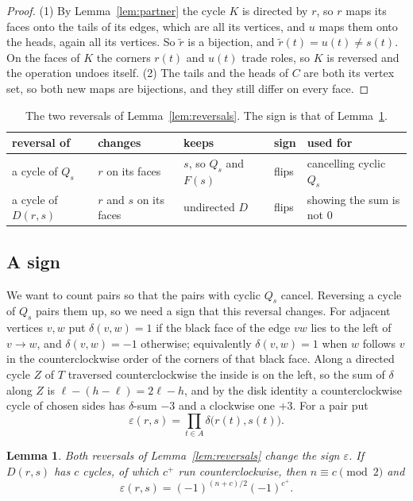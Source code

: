 \documentclass[10pt]{amsart}
\numberwithin{equation}{section}
\newtheorem{lemma}[equation]{Lemma}
\theoremstyle{definition}
\theoremstyle{remark}
\newcommand{\T}{T}
\newcommand{\eps}{\varepsilon}
\begin{document}
\begin{proof}
(1) By Lemma~\ref{lem:partner} the cycle $K$ is directed by $r$, so $r$ maps its faces onto the tails of its edges, which are all its vertices, and $u$ maps them onto the heads, again all its vertices.
So $\tilde r$ is a bijection, and $\tilde r(t)=u(t)\neq s(t)$.
On the faces of $K$ the corners $r(t)$ and $u(t)$ trade roles, so $K$ is reversed and the operation undoes itself.
(2) The tails and the heads of $C$ are both its vertex set, so both new maps are bijections, and they still differ on every face.
\end{proof}

\begin{table}[tb]
\centering
\begin{tabular}{@{}lllll@{}}
\toprule
reversal of & changes & keeps & sign & used for\\
\midrule
a cycle of $Q_s$ & $r$ on its faces & $s$, so $Q_s$ and $F(s)$ & flips & cancelling cyclic $Q_s$\\
a cycle of $D(r,s)$ & $r$ and $s$ on its faces & undirected $D$ & flips & showing the sum is not $0$\\
\bottomrule
\end{tabular}
\vspace{4pt}
\caption{The two reversals of Lemma~\ref{lem:reversals}. The sign is that of Lemma~\ref{lem:sign}.}
\label{tab:reversals}
\end{table}

\subsection*{A sign}
We want to count pairs so that the pairs with cyclic $Q_s$ cancel.
Reversing a cycle of $Q_s$ pairs them up, so we need a sign that this reversal changes.
For adjacent vertices $v,w$ put $\delta(v,w)=1$ if the black face of the edge $vw$ lies to the left of $v\to w$, and $\delta(v,w)=-1$ otherwise; equivalently $\delta(v,w)=1$ when $w$ follows $v$ in the counterclockwise order of the corners of that black face.
Along a directed cycle $Z$ of $\T$ traversed counterclockwise the inside is on the left, so the sum of $\delta$ along $Z$ is $\ell-(h-\ell)=2\ell-h$, and by the disk identity a counterclockwise cycle of chosen sides has $\delta$-sum $-3$ and a clockwise one $+3$.
For a pair put
\[
\eps(r,s)=\prod_{t\in A}\delta\bigl(r(t),s(t)\bigr).
\]

\begin{lemma}\label{lem:sign}
Both reversals of Lemma~\ref{lem:reversals} change the sign $\eps$.
If $D(r,s)$ has $c$ cycles, of which $c^+$ run counterclockwise, then $n\equiv c\pmod 2$ and
\[
\eps(r,s)=(-1)^{(n+c)/2}(-1)^{c^+}.
\]
\end{lemma}
\end{document}
